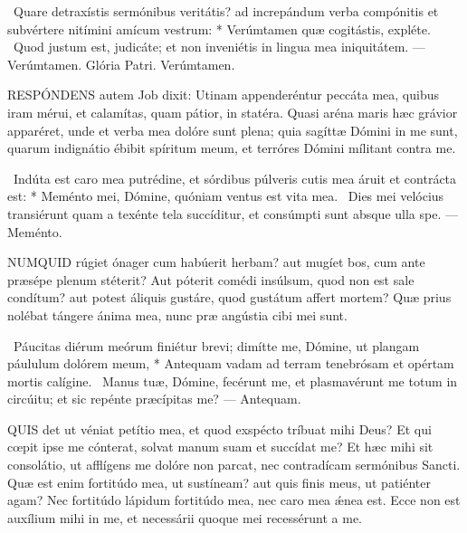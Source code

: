 \R\ Quare detraxístis sermónibus veritátis? ad increpándum verba compónitis et subvértere nitímini amícum vestrum: * Verúmtamen quæ cogitástis, expléte. \V\ Quod justum est, judicáte; et non inveniétis in lingua mea iniquitátem. — Verúmtamen. Glória Patri. Verúmtamen.




\lettrine[lines=2]{R}{ESPÓNDENS} autem Job dixit: Utinam appenderéntur peccáta mea, quibus iram mérui, et calamítas, quam pátior, in statéra. Quasi aréna maris hæc grávior apparéret, unde et verba mea dolóre sunt plena; quia sagíttæ Dómini in me sunt, quarum indignátio ébibit spíritum meum, et terróres Dómini mílitant contra me.

\R\ Indúta est caro mea putrédine, et sórdibus púlveris cutis mea áruit et contrácta est: * Meménto mei, Dómine, quóniam ventus est vita mea. \V\ Dies mei velócius transiérunt quam a texénte tela succíditur, et consúmpti sunt absque ulla spe. — Meménto.


\lettrine[lines=2]{N}{UMQUID} rúgiet ónager cum habúerit herbam? aut mugíet bos, cum ante præsépe plenum stéterit? Aut póterit comédi insúlsum, quod non est sale condítum? aut potest áliquis gustáre, quod gustátum affert mortem? Quæ prius nolébat tángere ánima mea, nunc præ angústia cibi mei sunt.

\R\ Páucitas diérum meórum finiétur brevi; dimítte me, Dómine, ut plangam páululum dolórem meum, * Antequam vadam ad terram tenebrósam et opértam mortis calígine. \V\ Manus tuæ, Dómine, fecérunt me, et plasmavérunt me totum in circúitu; et sic repénte præcípitas me? — Antequam.



\lettrine[lines=2]{Q}{UIS} det ut véniat petítio mea, et quod exspécto tríbuat mihi Deus? Et qui cœpit ipse me cónterat, solvat manum suam et succídat me? Et hæc mihi sit consolátio, ut afflígens me dolóre non parcat, nec contradícam sermónibus Sancti. Quæ est enim fortitúdo mea, ut sustíneam? aut quis finis meus, ut patiénter agam? Nec fortitúdo lápidum fortitúdo mea, nec caro mea ǽnea est. Ecce non est auxílium mihi in me, et necessárii quoque mei recessérunt a me.

